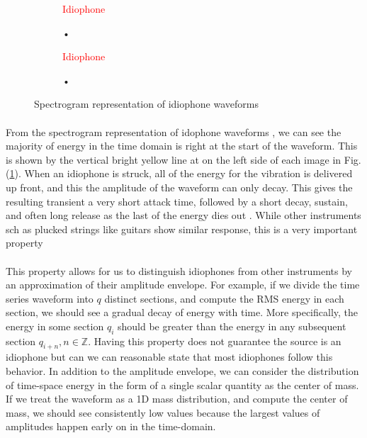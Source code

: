 \documentclass[12pt,letterpaper]{article}
\begin{document}
\begin{figure}
	\begin{subfigure}[b]{0.45\textwidth}
	\centering
	\textcolor{red}{Idiophone}
	\caption{•}
	\end{subfigure}
	\hfill
	\begin{subfigure}[b]{0.45\textwidth}
	\centering
	\textcolor{red}{Idiophone}
	\caption{•}
	\end{subfigure}
\caption{Spectrogram representation of idiophone waveforms}
\label{fig-PropertiesIdiophones}
\end{figure}

\paragraph*{}From the spectrogram representation of idophone waveforms , we can see the majority of energy in the time domain is right at the start of the waveform. This is shown by the vertical bright yellow line at on the left side of each image in Fig. (\ref{fig-PropertiesIdiophones}). When an idiophone is struck, all of the energy for the vibration is delivered up front, and this the amplitude of the waveform can only decay. This gives the resulting transient a very short attack time, followed by a short decay, sustain, and often long release as the last of the energy dies out \cite{White}. While other instruments sch as plucked strings like guitars show similar response, this is a very important property

\paragraph*{}This property allows for us to distinguish idiophones from other instruments by an approximation of their amplitude envelope. For example, if we divide the time series waveform into $q$ distinct sections, and compute the RMS energy in each section, we should see a gradual decay of energy with time. More specifically, the energy in some section $q_i$ should be greater than the energy in any subsequent section $q_{i + n}, n \in \mathbb{Z}$. Having this property does not guarantee the source is an idiophone but can we can reasonable state that most idiophones follow this behavior. In addition to the amplitude envelope, we can consider the distribution of time-space energy in the form of a single scalar quantity as the center of mass. If we treat the waveform as a 1D mass distribution, and compute the center of mass, we should see consistently low values because the largest values of amplitudes happen early on in the time-domain.
\end{document}
